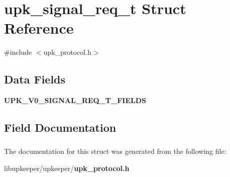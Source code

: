 \section{upk\_\-signal\_\-req\_\-t Struct Reference}
\label{structupk__signal__req__t}


{\ttfamily \#include $<$upk\_\-protocol.h$>$}

\subsection*{Data Fields}
\begin{DoxyCompactItemize}
\item 
{\bf UPK\_\-V0\_\-SIGNAL\_\-REQ\_\-T\_\-FIELDS}
\end{DoxyCompactItemize}


\subsection{Field Documentation}
\subsubsection[{UPK\_\-V0\_\-SIGNAL\_\-REQ\_\-T\_\-FIELDS}]{}\label{structupk__signal__req__t_a8bda4e7b2cc1bd0ff734aac8e61860ab}


The documentation for this struct was generated from the following file:\begin{DoxyCompactItemize}
\item 
libupkeeper/upkeeper/{\bf upk\_\-protocol.h}\end{DoxyCompactItemize}
